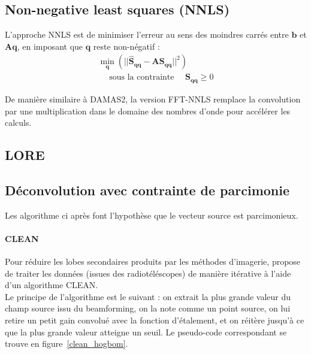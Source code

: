 \subsection{Non-negative least squares (NNLS)}
L'approche NNLS est de minimiser l'erreur au sens des moindres carrés entre $\bm{b}$ et $\bm{Aq}$, en imposant que $\bm{q}$ reste non-négatif : 
\begin{eqnarray}
\min_{\bm{q}}\left(||\bm{\hat{S}_{qq}}-\bm{A}\bm{S_{qq}}||^2 \right)\\
\text{~~~~sous la contrainte~~~~}\bm{S_{qq}}\geq 0
\end{eqnarray}

De manière similaire à DAMAS2, la version FFT-NNLS remplace la convolution par une multiplication dans le domaine des nombres d'onde pour accélérer les calculs.

\subsection{LORE}


\subsection{Déconvolution avec contrainte de parcimonie}
Les algorithme ci après font l'hypothèse que le vecteur source est parcimonieux. 

\paragraph{CLEAN}
Pour réduire les lobes secondaires produits par les méthodes d'imagerie, \citep{Hogbom1974} propose de traiter les données (issues des radiotéléscopes) de manière itérative à l'aide d'un algorithme CLEAN.\\
Le principe de l'algorithme est le suivant : on extrait la plus grande valeur du champ source issu du beamforming, on la note comme un point source, on lui retire un petit gain convolué avec la fonction d'étalement, et on réitère jusqu'à ce que la plus grande valeur atteigne un seuil. Le pseudo-code correspondant se trouve en figure~\ref{clean_hogbom}.\\


